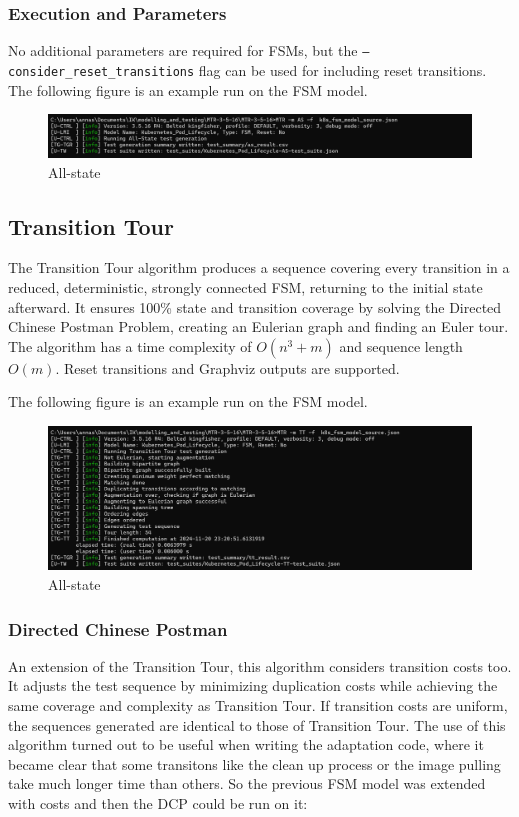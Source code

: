 \documentclass[main.tex]{subfiles}
\begin{document}
\subsubsection{Execution and Parameters}
No additional parameters are required for FSMs, but the \texttt{--consider\_reset\_transitions} flag can be used for including reset transitions.
The following figure is an example run on the FSM model.
\begin{figure}[H]
    \centering
    \includegraphics[width=\textwidth]{test_results/AS.png}
    \caption{All-state}
    \label{fig:all_state}
\end{figure}


\subsection{Transition Tour}
The Transition Tour algorithm produces a sequence covering every transition in a reduced, deterministic, strongly connected FSM, returning to the initial state afterward. It ensures 100\% state and transition coverage by solving the Directed Chinese Postman Problem, creating an Eulerian graph and finding an Euler tour. The algorithm has a time complexity of $O(n^3 + m)$ and sequence length $O(m)$. Reset transitions and Graphviz outputs are supported.

The following figure is an example run on the FSM model.
\begin{figure}[H]
    \centering
    \includegraphics[width=\textwidth]{test_results/TT.png}
    \caption{All-state}
    \label{fig:all_state}
\end{figure}

\subsubsection{Directed Chinese Postman}
An extension of the Transition Tour, this algorithm considers transition costs too. It adjusts the test sequence by minimizing duplication costs while achieving the same coverage and complexity as Transition Tour. If transition costs are uniform, the sequences generated are identical to those of Transition Tour.
The use of this algorithm turned out to be useful when writing the adaptation code, where it became clear that some transitons like the clean up process or the image pulling take much longer time than others. So the previous FSM model was extended with costs and then the DCP could be run on it:
\end{document}
